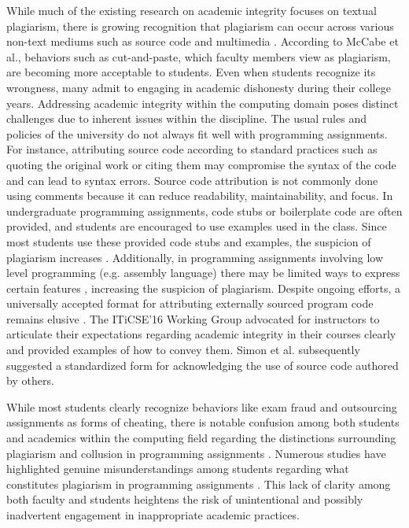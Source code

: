 While much of the existing research on academic integrity focuses on textual plagiarism, there is growing recognition that plagiarism can occur across various non-text mediums such as source code and multimedia \cite{Marcin2016,10.1145/2526968.2526971}. According to McCabe et al.\cite{84f6c08b47844b54868caf82c625fc66}, behaviors such as cut-and-paste, which faculty members view as plagiarism, are becoming more acceptable to students. Even when students recognize its wrongness, many admit to engaging in academic dishonesty during their college years\cite{Bernardi2004-BERETD}. Addressing academic integrity within the computing domain poses distinct challenges due to inherent issues within the discipline. The usual rules and policies of the university do not always fit well with programming assignments. For instance, attributing source code according to standard practices such as quoting the original work or citing them may compromise the syntax of the code and can lead to syntax errors. Source code attribution is not commonly done using comments because it can reduce readability, maintainability, and focus. In undergraduate programming assignments, code stubs or boilerplate code are often provided, and students are encouraged to use examples used in the class. Since most students use these provided code stubs and examples, the suspicion of plagiarism increases \cite{10.5555/1151869.1151888}. 
Additionally, in programming assignments involving low level programming (e.g. assembly language) there may be limited ways to express certain features \cite{10.1145/3160489.3160502}, increasing the suspicion of plagiarism. 
Despite ongoing efforts, a universally accepted format for attributing externally sourced program code remains elusive \cite{10.1145/1562877.1562900}. The ITiCSE’16 Working Group \cite{10.1145/3024906.3024910} advocated for instructors to articulate their expectations regarding academic integrity in their courses clearly and provided examples of how to convey them. Simon et al.\cite{10.1145/3160489.3160502} subsequently suggested a standardized form for acknowledging the use of source code authored by others. 

While most students clearly recognize behaviors like exam fraud and outsourcing assignments as forms of cheating, there is notable confusion among both students and academics within the computing field regarding the distinctions surrounding plagiarism and collusion in programming assignments \cite{SCPlagiarism}. Numerous studies have highlighted genuine misunderstandings among students regarding what constitutes plagiarism in programming assignments \cite{SCPlagiarism, Cosma2008TowardsAD, 10.1145/637610.544468, 10.1145/2526968.2526971}. This lack of clarity among both faculty and students heightens the risk of unintentional and possibly inadvertent engagement in inappropriate academic practices. 

